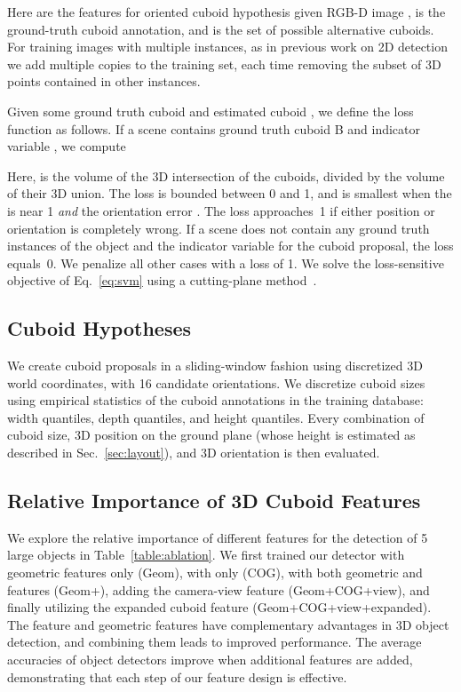Here  are the features for oriented cuboid hypothesis  given RGB-D image ,  is the ground-truth cuboid annotation, and  is the set of possible alternative cuboids.
For training images with multiple instances, as in previous work on 2D detection~\cite{vedaldi09structured} we add multiple copies to the training set, each time removing the subset of 3D points contained in other instances.

Given some ground truth cuboid  and estimated cuboid , we define the loss function as follows. If a scene contains ground truth cuboid B and indicator variable , we compute

Here,  is the volume of the 3D intersection of the cuboids, divided by the volume of their 3D union.  The loss is bounded between 0 and 1, and is smallest when the  is near 1 \emph{and} the orientation error .  The loss approaches~1 if either position or orientation is completely wrong. If a scene does not contain any ground truth 
instances of the object and 
the indicator variable  for the cuboid proposal, the loss equals~0. We penalize all other cases with a loss of 1. We solve the loss-sensitive objective of Eq.~\eqref{eq:svm} using a cutting-plane method~\cite{joachims2009cutting}. 


\subsection{Cuboid Hypotheses}
We create cuboid proposals in a sliding-window fashion using discretized
3D world coordinates, with 16 candidate orientations. We
discretize cuboid sizes using empirical statistics of the cuboid annotations
in the training database:
 width quantiles, 
 depth quantiles, and 
height quantiles. Every combination of cuboid size, 3D
position on the ground plane (whose height is estimated as described in Sec.~\ref{sec:layout}), and 3D orientation is then evaluated.


\subsection{Relative Importance of 3D Cuboid Features}
We explore the relative importance of different features for the detection of 5 large objects
in Table~\ref{table:ablation}. We first trained our detector with geometric 
features only (Geom), with \cog only (COG), with both geometric and \cog features (Geom+\cog), 
adding the camera-view feature (Geom+COG+view), and finally utilizing the expanded 
cuboid feature (Geom+COG+view+expanded). 
The \cog feature and geometric features
have complementary advantages in 3D object detection, and combining
them leads to improved performance. 
The average accuracies of object detectors improve when additional features are added, 
demonstrating that each step of our feature design is effective.



